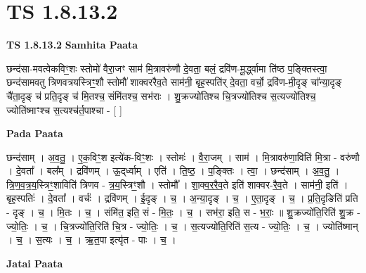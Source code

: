 \documentclass[17pt]{extarticle}
\begin{document}
\section{ TS 1.8.13.2 }

\textbf{TS 1.8.13.2 } \newline
\textbf{Samhita Paata} \newline

छन्द॑सा-मवत्वेकविꣳ॒॒शः स्तोमो॑ वैरा॒जꣳ साम॑ मि॒त्रावरु॑णौ दे॒वता॒ बलं॒ द्रवि॑ण-मू॒र्द्ध्वामा ति॑ष्ठ प॒ङ्क्तिस्त्वा॒ छन्द॑सामवतु त्रिणवत्रयस्त्रिꣳ॒॒शौ स्तोमौ॑ शाक्वररैव॒ते साम॑नी॒ बृह॒स्पति॑र् दे॒वता॒ वर्चो॒ द्रवि॑ण-मी॒दृङ् चा᳚न्या॒दृङ् चै॑ता॒दृङ् च॑ प्रति॒दृङ् च॑ मि॒तश्च॒ संमि॑तश्च॒ सभ॑राः । शु॒क्रज्यो॑तिश्च चि॒त्रज्यो॑तिश्च स॒त्यज्यो॑तिश्च॒ ज्योति॑ष्माꣳश्च स॒त्यश्च॑र्त॒पाश्चा - [ ] \newline

\textbf{Pada Paata} \newline

छन्द॑साम् । अ॒व॒तु॒ । ए॒क॒विꣳ॒॒श इत्ये॑क-विꣳ॒॒शः । स्तोमः॑ । वै॒रा॒जम् । साम॑ । मि॒त्रावरु॑णा॒विति॑ मि॒त्रा - वरु॑णौ । दे॒वता᳚ । बल᳚म् । द्रवि॑णम् । ऊ॒द्‌र्ध्वाम् । एति॑ । ति॒ष्ठ॒ । प॒ङ्क्तिः । त्वा॒ । छन्द॑साम् । अ॒व॒तु॒ । त्रि॒ण॒व॒त्र॒य॒स्त्रिꣳ॒॒शाविति॑ त्रिणव - त्र॒य॒स्त्रिꣳ॒॒शौ । स्तोमौ᳚ । शा॒क्व॒र॒रै॒व॒ते इति॑ शाक्वर-रै॒व॒ते । साम॑नी॒ इति॑ । बृह॒स्पतिः॑ । दे॒वता᳚ । वर्चः॑ । द्रवि॑णम् । ई॒दृङ् । च॒ । अ॒न्या॒दृङ् । च॒ । ए॒ता॒दृङ् । च॒ । प्र॒ति॒दृङिति॑ प्रति - दृङ् । च॒ । मि॒तः । च॒ । संमि॑त॒ इति॒ सं - मि॒तः॒ । च॒ । सभ॑रा॒ इति॒ स - भ॒राः॒ ॥ शु॒क्रज्यो॑ति॒रिति॑ शु॒क्र - ज्यो॒तिः॒ । च॒ । चि॒त्रज्यो॑ति॒रिति॑ चि॒त्र - ज्यो॒तिः॒ । च॒ । स॒त्यज्यो॑ति॒रिति॑ स॒त्य - ज्यो॒तिः॒ । च॒ । ज्योति॑ष्मान् । च॒ । स॒त्यः । च॒ । ऋ॒त॒पा इत्यृ॑त - पाः । च॒ ।  \newline



\textbf{Jatai Paata} \newline
\end{document}
